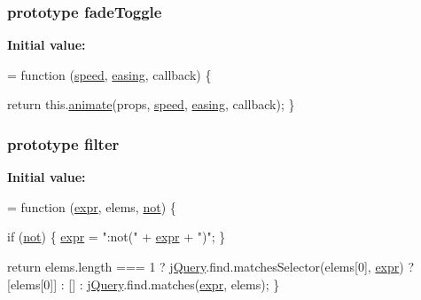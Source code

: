 \subsubsection[{\texorpdfstring{fade\+Toggle}{fadeToggle}}]{ {\bf prototype} fade\+Toggle}\hypertarget{jquery-2_82_81-vsdoc_8js_ada46ab8667c3108cbdaf50446d41cc59}{}\label{jquery-2_82_81-vsdoc_8js_ada46ab8667c3108cbdaf50446d41cc59}
{\bfseries Initial value\+:}
\begin{DoxyCode}
= \textcolor{keyword}{function} (\hyperlink{jquery-2_82_81-vsdoc_8js_add98c90065e6563cba26ff6d2016c46c}{speed}, \hyperlink{jquery-2_82_81-vsdoc_8js_a9758a312629fa6de1744280dd6e6253b}{easing}, callback) \{
        

        \textcolor{keywordflow}{return} this.\hyperlink{jquery-2_82_81-vsdoc_8js_a956a1d08128d41115c45b6815814a64d}{animate}(props, \hyperlink{jquery-2_82_81-vsdoc_8js_add98c90065e6563cba26ff6d2016c46c}{speed}, \hyperlink{jquery-2_82_81-vsdoc_8js_a9758a312629fa6de1744280dd6e6253b}{easing}, callback);
    \}
\end{DoxyCode}
\subsubsection[{\texorpdfstring{filter}{filter}}]{ {\bf prototype} filter}\hypertarget{jquery-2_82_81-vsdoc_8js_ac99d0cf56cab46114f5765a14e03ad6d}{}\label{jquery-2_82_81-vsdoc_8js_ac99d0cf56cab46114f5765a14e03ad6d}
{\bfseries Initial value\+:}
\begin{DoxyCode}
= \textcolor{keyword}{function} (\hyperlink{jquery-2_82_81-vsdoc_8js_aaacd1d5b3593ba4dfff6d67d4f6cfda1}{expr}, elems, \hyperlink{jquery-2_82_81-vsdoc_8js_a78ab1ea877c73295e1e4cd1002ad38c7}{not}) \{

        \textcolor{keywordflow}{if} (\hyperlink{jquery-2_82_81-vsdoc_8js_a78ab1ea877c73295e1e4cd1002ad38c7}{not}) \{
            \hyperlink{jquery-2_82_81-vsdoc_8js_aaacd1d5b3593ba4dfff6d67d4f6cfda1}{expr} = \textcolor{stringliteral}{":not("} + \hyperlink{jquery-2_82_81-vsdoc_8js_aaacd1d5b3593ba4dfff6d67d4f6cfda1}{expr} + \textcolor{stringliteral}{")"};
        \}

        \textcolor{keywordflow}{return} elems.length === 1 ?
            \hyperlink{jquery-2_82_81-vsdoc_8js_add5237586d970a38a81f990e8eb28c6c}{jQuery}.find.matchesSelector(elems[0], \hyperlink{jquery-2_82_81-vsdoc_8js_aaacd1d5b3593ba4dfff6d67d4f6cfda1}{expr}) ? [elems[0]] : [] :
            \hyperlink{jquery-2_82_81-vsdoc_8js_add5237586d970a38a81f990e8eb28c6c}{jQuery}.find.matches(\hyperlink{jquery-2_82_81-vsdoc_8js_aaacd1d5b3593ba4dfff6d67d4f6cfda1}{expr}, elems);
    \}
\end{DoxyCode}
